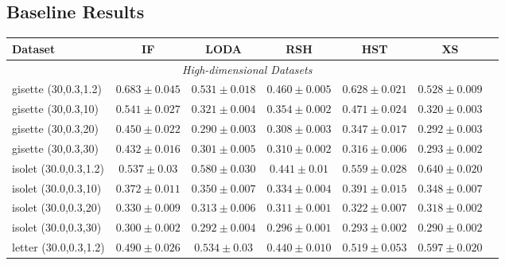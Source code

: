 \subsection{Baseline Results}
\begin{footnotesize}
\begin{table}[p!]
		\begin{tabular}{lcccccc}
				\toprule
				\textbf{Dataset} & \textbf{IF} &  \textbf{LODA} & \textbf{RSH} &  \textbf{HST}  & \textbf{XS}\\
				\midrule
				\multicolumn{6}{c}{\textit{High-dimensional Datasets}}\\
gisette (30,0.3,1.2)  & $0.683 \pm 0.045$ &  $0.531 \pm 0.018$ &  $0.460 \pm 0.005$ &  $0.628 \pm 0.021$  & $0.528 \pm  0.009$ \\
gisette (30,0.3,10)   & $0.541 \pm 0.027$ &  $0.321 \pm 0.004$ &  $0.354 \pm 0.002$ &  $0.471 \pm 0.024$  & $0.320 \pm  0.003$   \\
gisette (30,0.3,20)   & $0.450 \pm 0.022$ &  $0.290 \pm 0.003$ &  $0.308 \pm 0.003$ &  $0.347 \pm 0.017$  & $0.292 \pm  0.003$  \\
gisette (30,0.3,30)   & $0.432 \pm 0.016$ &  $0.301 \pm 0.005$ &  $0.310 \pm 0.002$ &  $0.316 \pm 0.006$  & $0.293 \pm  0.002$  \\
\midrule
isolet (30.0,0.3,1.2) & $0.537 \pm 0.03$  &  $0.580 \pm 0.030$ &  $0.441 \pm 0.01$  &  $0.559 \pm 0.028$  & $0.640 \pm  0.020$   \\
isolet (30.0,0.3,10)  & $0.372 \pm 0.011$ &  $0.350 \pm 0.007$ &  $0.334 \pm 0.004$ &  $0.391 \pm 0.015$  & $0.348 \pm  0.007$  \\
isolet (30.0,0.3,20)  & $0.330 \pm 0.009$ &  $0.313 \pm 0.006$ &  $0.311 \pm 0.001$ &  $0.322 \pm 0.007$  & $0.318 \pm  0.002$   \\
isolet (30.0,0.3,30)  & $0.300 \pm 0.002$ &  $0.292 \pm 0.004$ &  $0.296 \pm 0.001$ &  $0.293 \pm 0.002$  & $0.290 \pm  0.002$  \\
\midrule
letter (30.0,0.3,1.2) & $0.490 \pm 0.026$ &  $0.534 \pm 0.03$  &  $0.440 \pm 0.010$ &  $0.519 \pm 0.053$ & $0.597 \pm  0.020$   \\

\end{tabular}
\end{table}
\end{footnotesize}
